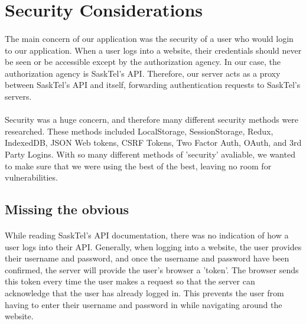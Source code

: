 \documentclass[12pt]{article}
\begin{document}
\newpage
\section{Security Considerations}
\paragraph{}
	The main concern of our application was the security of a user who would login to our application. When a user logs into a website, their credentials should never be seen or be accessible except by the authorization agency. In our case, the authorization agency is SaskTel's API. Therefore, our server acts as a proxy between SaskTel's API and itself, forwarding authentication requests to SaskTel's servers.
\paragraph{}	
	Security was a huge concern, and therefore many different security methods were researched. These methods included LocalStorage, SessionStorage, Redux, IndexedDB, JSON Web tokens, CSRF Tokens, Two Factor Auth, OAuth, and 3rd Party Logins. With so many different methods of 'security' avaliable, we wanted to make sure that we were using the best of the best, leaving no room for vulnerabilities.

\subsection{Missing the obvious}
\paragraph{}	
	While reading SaskTel's API documentation, there was no indication of how a user logs into their API. Generally, when logging into a website, the user provides their username and password, and once the username and password have been confirmed, the server will provide the user's browser a 'token'. The browser sends this token every time the user makes a request so that the server can acknowledge that the user has already logged in. This prevents the user from having to enter their username and password in while navigating around the website. 
\end{document}
